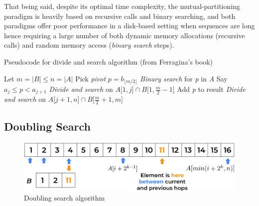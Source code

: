 That being said, despite its optimal time complexity, the mutual-partitioning paradigm is heavily based on recursive calls and binary searching, and both paradigms offer poor performance in a disk-based setting when sequences are long hence requiring a large number of both dynamic memory allocations (recursive calls) and random memory access (\textit{binary search} steps).

\begin{algorithm}
    \captionsetup{labelsep=newline}
    \caption{Pseudocode for divide and search algorithm \label{alg:divandsearch} (from Ferragina's book)}
    \begin{algorithmic}[1]
        \State Let $m=|B| \leq n=|A|$
        \State Pick \textit{pivot} $p=b_{\lfloor m/2 \rfloor}$
        \State \textit{Binary search} for \textit{p} in \textit{A} \Comment Say $a_j \leq p < a_{j+1}$
        \State \textit{Divide and search} on $A\big[1, j\big] \cap B\big[1, \frac{m}{2}-1\big]$
            \State Add \textit{p} to result
        \EndIf
        \State \textit{Divide and search} on $A\big[ j+1, n\big] \cap B\big[\frac{m}{2}+1, m\big]$
    \end{algorithmic}
\end{algorithm}

\subsection{Doubling Search \label{galloping}}

\begin{figure}[H] 
    \begin{center}
        \includegraphics[width=.8\textwidth]{imgs/galloping.png}
        \caption{Doubling search algorithm \label{fig:galloping}}
    \end{center}
\end{figure}

